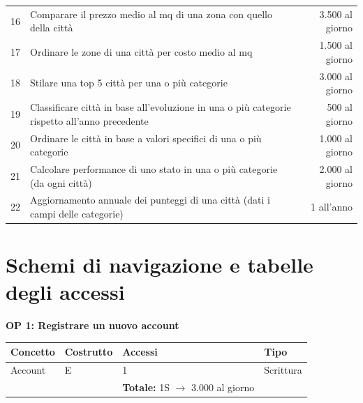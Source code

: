 \documentclass[a4paper,12pt]{report}
\begin{document}
\begin{table}[H]
\begin{adjustbox}{width=1.45\textwidth,center}
\begin{tabular}{clr}
             16 & Comparare il prezzo medio al mq di una zona con quello della città & 3.500 al giorno \\ 
             17 & Ordinare le zone di una città per costo medio al mq & 1.500 al giorno \\
             18 & Stilare una top 5 città per una o più categorie & 3.000 al giorno \\
             19 & Classificare città in base all'evoluzione in una o più categorie rispetto all'anno precedente & 500 al giorno \\ 
             20 & Ordinare le città in base a valori specifici di una o più categorie & 1.000 al giorno \\ 
             21 & Calcolare performance di uno stato in una o più categorie (da ogni città) & 2.000 al giorno \\ 
             22 & Aggiornamento annuale dei punteggi di una città (dati i campi delle categorie) & 1 all'anno \\ [1ex]
            \end{tabular}
            \end{adjustbox}
            \end{table}
        	
    	\section{Schemi di navigazione e tabelle degli accessi}	

        \textbf{OP 1: Registrare un nuovo account}
        	\begin{table}[H]
            \centering
             \begin{tabular}{llll}
             \rowcolor{yellow!20}\textbf{Concetto} & \textbf{Costrutto} & \textbf{Accessi} & \textbf{Tipo} \\ [0.5ex] 
             \hline
             Account & E & 1 & Scrittura \\ 
             \hline
             \rowcolor{yellow!20}\rowcolor{yellow!20} &   & \textbf{Totale:} 1S $\rightarrow$ 3.000 al giorno &  \\ [1ex] 
             \end{tabular}
            \end{table}
\end{document}
